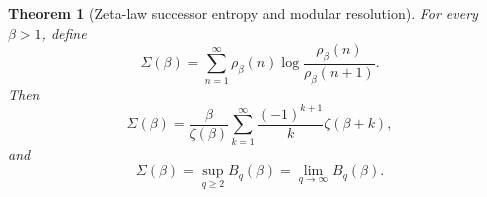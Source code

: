 \documentclass[11pt]{article}
\numberwithin{equation}{section}
\newtheorem{theorem}{Theorem}[section]
\theoremstyle{definition}
\theoremstyle{remark}
\newcommand{\1}{\mathbf 1}
\begin{document}
\begin{theorem}[Zeta-law successor entropy and modular resolution]
\label{thm:successor-entropy}
For every \(\beta>1\), define
\begin{equation}
\label{eq:successor-entropy}
\Sigma(\beta)=\sum_{n=1}^{\infty}\rho_\beta(n)
\log\frac{\rho_\beta(n)}{\rho_\beta(n+1)}.
\end{equation}
Then
\begin{equation}
\label{eq:successor-entropy-series}
\Sigma(\beta)=
\frac{\beta}{\zeta(\beta)}
\sum_{k=1}^{\infty}\frac{(-1)^{k+1}}{k}\zeta(\beta+k),
\end{equation}
and
\begin{equation}
\label{eq:successor-entropy-modular-resolution}
\Sigma(\beta)=\sup_{q\ge2}B_q(\beta)=\lim_{q\to\infty}B_q(\beta).
\end{equation}
\end{theorem}
\end{document}
